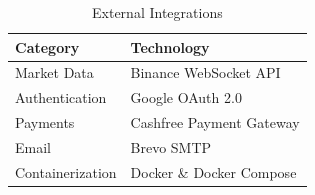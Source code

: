 \begin{table}[htb]
\fontsize{10}{12}\selectfont
\caption{External Integrations}
\label{tab:external_tech}
\centering
\begin{tabular}{|p{4cm}|p{8cm}|}
	\hline
	\textbf{Category} & \textbf{Technology} \\
	\hline
	Market Data & Binance WebSocket API \\
	\hline
	Authentication & Google OAuth 2.0 \\
	\hline
	Payments & Cashfree Payment Gateway \\
	\hline
	Email & Brevo SMTP \\
	\hline
	Containerization & Docker \& Docker Compose \\
	\hline
\end{tabular}
\end{table}